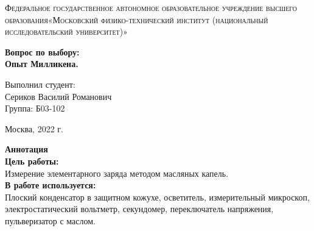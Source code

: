 \documentclass[a4paper, 12pt]{article}%
\begin{document}
	\begin{titlepage}
		\begin{center}
			\textsc{Федеральное государственное автономное образовательное учреждение высшего образования«Московский физико-технический институт (национальный исследовательский университет)»\\[5mm]
			}
			
			\vfill
			
			\textbf{Вопрос по выбору: \\[3mm]
				Опыт Милликена.
				\\[50mm]
			}
			
		\end{center}
		
		\hfill
		\begin{minipage}{.5\textwidth}
			Выполнил студент:\\[2mm]
			Сериков Василий Романович\\[2mm]
			Группа: Б03-102\\[5mm]
			
		\end{minipage}
		\vfill
		\begin{center}
			Москва, 2022 г.
		\end{center}
		
	\end{titlepage}
	
	\newpage
	\textbf{Аннотация}\\
	
	
	\textbf{Цель работы: }\\
	Измерение элементарного заряда методом масляных капель.\\
	
	\textbf{В работе используется: }\\
	Плоский конденсатор в защитном кожухе, осветитель, измерительный микроскоп, электростатический вольтметр, секундомер, переключатель напряжения, пульверизатор с маслом.\\
	
\end{document}
